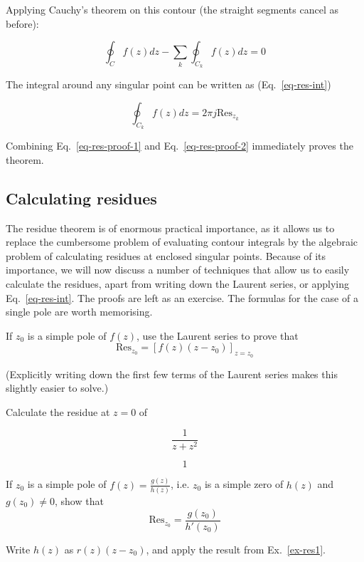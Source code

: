 Applying Cauchy's theorem on this contour (the straight segments cancel as before):

\begin{equation}
\oint_{{C}} f(z) dz - \sum_k \oint_{{C}_k} f(z) dz = 0
\label{eq-res-proof-1}
\end{equation}

The integral around any singular point can be written as (Eq.~\ref{eq-res-int})

\begin{equation}
\oint_{{C}_k} f(z) dz = 2 \pi j \mathrm{Res}_{z_k} \label{eq-res-proof-2}
\end{equation} 

Combining Eq.~\ref{eq-res-proof-1} and Eq.~\ref{eq-res-proof-2} immediately proves the theorem.

\subsection*{Calculating residues}

The residue theorem is of enormous practical importance, as it allows us to replace the cumbersome problem of evaluating contour integrals by the algebraic problem of calculating residues at enclosed singular points. Because of its importance, we will now discuss a number of techniques that allow us to easily calculate the residues, apart from writing down the Laurent series, or applying Eq.~\ref{eq-res-int}. The proofs are left as an exercise. The formulas for the case of a single pole are worth memorising.

\begin{exer}
  If $z_0$ is a simple pole of $f(z)$, use the Laurent series to prove that
  $$\mathrm{Res}_{z_0} = \left[f(z)(z-z_0)\right]_{z=z_0}$$

  (Explicitly writing down the first few terms of the Laurent series makes this slightly easier to solve.)
  
\label{ex-res1}
\end{exer}

\begin{exer}
  Calculate the residue at $z=0$ of

   $$\frac{1}{z+z^2}$$ 
\begin{sol}
  $$1$$
\end{sol}
\end{exer}

\begin{exer}
  If $z_0$ is a simple pole of $f(z)=\frac{g(z)}{h(z)}$, i.e. $z_0$ is a simple zero of $h(z)$ and $g(z_0) \ne 0$, show that
    $$\mathrm{Res}_{z_0} = \frac{g(z_0)}{h'(z_0)}$$
\begin{hnt}
Write $h(z)$ as $r(z)(z-z_0)$, and apply the result from Ex.~\ref{ex-res1}.
\end{hnt}
\end{exer}

